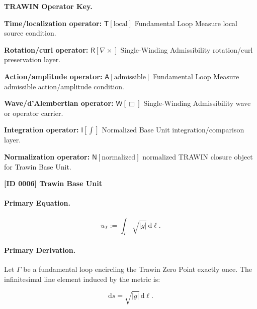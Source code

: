 \par\vspace{0.45\baselineskip}
\noindent\begin{minipage}[t]{\linewidth}
\begingroup
\small
\raggedright
\textbf{TRAWIN Operator Key.}\par
\noindent\textbf{Time/localization operator:} $\mathsf{T}\!\left[\mathrm{local}\right]$ Fundamental Loop Measure local source condition.\par
\noindent\textbf{Rotation/curl operator:} $\mathsf{R}\!\left[\nabla\times\right]$ Single-Winding Admissibility rotation/curl preservation layer.\par
\noindent\textbf{Action/amplitude operator:} $\mathsf{A}\!\left[\mathrm{admissible}\right]$ Fundamental Loop Measure admissible action/amplitude condition.\par
\noindent\textbf{Wave/d'Alembertian operator:} $\mathsf{W}\!\left[\Box\right]$ Single-Winding Admissibility wave or operator carrier.\par
\noindent\textbf{Integration operator:} $\mathsf{I}\!\left[\int\right]$ Normalized Base Unit integration/comparison layer.\par
\noindent\textbf{Normalization operator:} $\mathsf{N}\!\left[\mathrm{normalized}\right]$ normalized TRAWIN closure object for Trawin Base Unit.\par
\endgroup
\end{minipage}

\clearpage
\noindent\textbf{[ID 0006] Trawin Base Unit}\par
\vspace{0.35em}
\paragraph{Primary Equation.}
\begin{equation}
u_T := \int_{\Gamma}\sqrt{|g|}\,\mathrm{d}\ell .
\end{equation}

\paragraph{Primary Derivation.}
Let $\Gamma$ be a fundamental loop encircling the Trawin Zero Point exactly once.  
The infinitesimal line element induced by the metric is:

\begin{equation}
\mathrm{d}s = \sqrt{|g|}\,\mathrm{d}\ell .
\end{equation}

